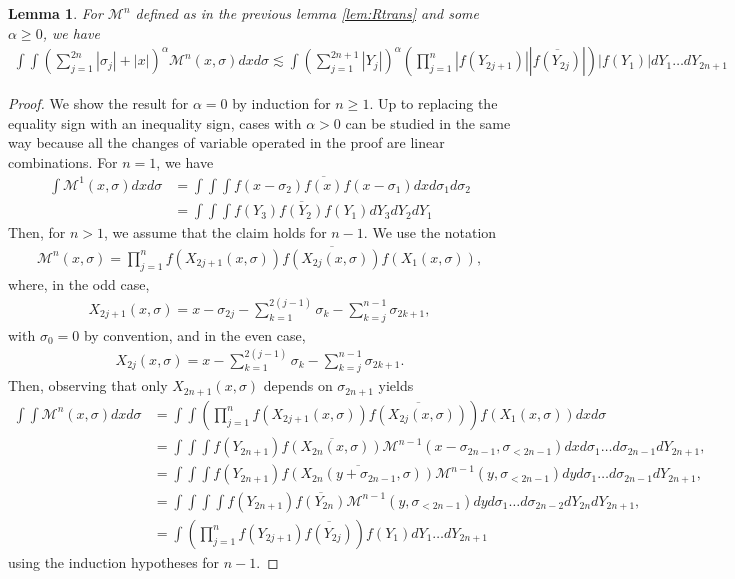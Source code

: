 \documentclass[a4paper, 15pt]{article}
\numberwithin{equation}{section}
\newtheorem{lem}[defi]{Lemma}
\begin{document}
\begin{lem}
\label{lem:Rcalculus}
For $\mathcal{M}^n$ defined as in the previous lemma \ref{lem:Rtrans} and some $\alpha\geq0$, we have 
\begin{align}
\label{equation:Rcalculus}
\int\int (\sum_{j=1}^{2n}|\sigma_j|+|x|)^{\alpha}\mathcal{M}^n(x,\sigma)dxd\sigma\lesssim\int (\sum_{j=1}^{2n+1}|Y_{j}|)^{\alpha}\left(\prod^{n}_{j=1}|f(Y_{2j+1})||\overline{f(Y_{2j})}|\right)|f(Y_{1})|dY_1\dots dY_{2n+1}
\end{align}
\end{lem}
\begin{proof}
We show the result for $\alpha=0$ by induction for $n\geq 1$. Up to replacing the equality sign with an inequality sign, cases with $\alpha>0$ can be studied in the same way because all the changes of variable operated in the proof are linear combinations. For $n=1$, we have 
\begin{align*}
\int\mathcal{M}^1(x,\sigma)dxd\sigma&=\int\int\int f(x-\sigma_2)\overline{f(x)}f(x-\sigma_1)dxd\sigma_1d\sigma_2\\
&=\int\int\int f(Y_3)\overline{f(Y_2)}f(Y_1)dY_3dY_2dY_1
\end{align*}
Then, for $n>1$, we assume that the claim holds for $n-1$. We use the notation
\begin{align*}
   \mathcal{M}^n(x,\sigma)=\prod^{n}_{j=1}f(X_{2j+1}(x,\sigma))\overline{f(X_{2j}(x,\sigma))}f(X_{1}(x,\sigma)),
\end{align*}
where, in the odd case,
\begin{align*}
X_{2j+1}(x,\sigma)=x-\sigma_{2j}-\sum^{2(j-1)}_{k=1}\sigma_k-\sum^{n-1}_{k=j}\sigma_{2k+1},
  \end{align*}
  with  $\sigma_{0}=0$ by convention, and in the even case,
  \begin{align*}
X_{2j}(x,\sigma)=x-\sum^{2(j-1)}_{k=1}\sigma_k-\sum^{n-1}_{k=j}\sigma_{2k+1}.
  \end{align*}
Then, observing that only $X_{2n+1}(x,\sigma)$ depends on $\sigma_{2n+1}$ yields
\begin{align*}
\int\int \mathcal{M}^n(x,\sigma)dxd\sigma&=\int\int\left(\prod^{n}_{j=1}f(X_{2j+1}(x,\sigma))\overline{f(X_{2j}(x,\sigma))}\right)f(X_{1}(x,\sigma))dxd\sigma\\
&=\int\int\int f(Y_{2n+1})\overline{f(X_{2n}(x,\sigma))}\mathcal{M}^{n-1}(x-\sigma_{2n-1},\sigma_{<2n-1})dxd\sigma_1\dots d\sigma_{2n-1}dY_{2n+1},\\
&=\int\int\int f(Y_{2n+1})\overline{f(X_{2n}(y+\sigma_{2n-1},\sigma))}\mathcal{M}^{n-1}(y,\sigma_{<2n-1})dyd\sigma_1\dots d\sigma_{2n-1}dY_{2n+1},\\
&=\int\int\int\int f(Y_{2n+1})\overline{f(Y_{2n})}\mathcal{M}^{n-1}(y,\sigma_{<2n-1})dyd\sigma_1\dots d\sigma_{2n-2}dY_{2n}dY_{2n+1},\\
&=\int \left(\prod^{n}_{j=1}f(Y_{2j+1})\overline{f(Y_{2j})}\right)f(Y_{1})dY_1\dots dY_{2n+1}
\end{align*}
using the induction hypotheses for $n-1$. 
\end{proof}
\end{document}
